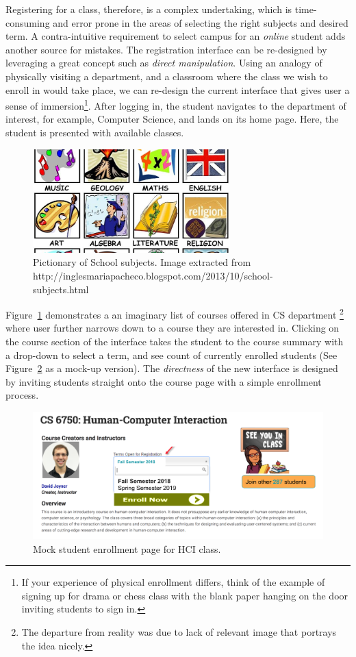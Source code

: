 \documentclass[12pt,letterpaper]{article}
\begin{document}
Registering for a class, therefore, is a complex undertaking, which is time-consuming and error prone in the areas of selecting the right subjects and desired term. A contra-intuitive requirement to select campus for an \textit{online} student adds another source for mistakes.
The registration interface can be re-designed by leveraging a great concept such as \textit{direct manipulation}. Using an analogy of physically visiting a department, and a classroom where the class we wish to enroll in would take place, we can re-design the current interface that gives user a sense of immersion\footnote{If your experience of physical enrollment differs, think of the example of signing up for drama or chess class with the blank paper hanging on the door inviting students to sign in.}. After logging in, the student navigates to the department of interest, for example, Computer Science, and lands on its home page. Here, the student is presented with available classes.

\begin{figure}[h]
\centering
\includegraphics[width=3in,scale=.3]{figures/p2/school_subjects_modified.jpg}
\caption{Pictionary of School subjects. Image extracted from http://inglesmariapacheco.blogspot.com/2013/10/school-subjects.html}
\label{fig::1}
\end{figure}

Figure~\ref{fig::1} demonstrates a an imaginary list of courses offered in CS department \footnote{The departure from reality was due to lack of relevant image that portrays the idea nicely.} where user further narrows down to a course they are interested in. Clicking on the course section of the interface takes the student to the course summary with a drop-down to select a term, and see count of currently enrolled students (See Figure~\ref{fig::2} as a mock-up version). The \textit{directness} of the new interface is designed by inviting students straight onto the course page with a simple enrollment process. 

\begin{figure}[h]
\centering
\includegraphics[scale=.5]{figures/p2/gatech_enrollment.png}
\caption{Mock student enrollment page for HCI class.}
\label{fig::2}
\end{figure}
\end{document}
